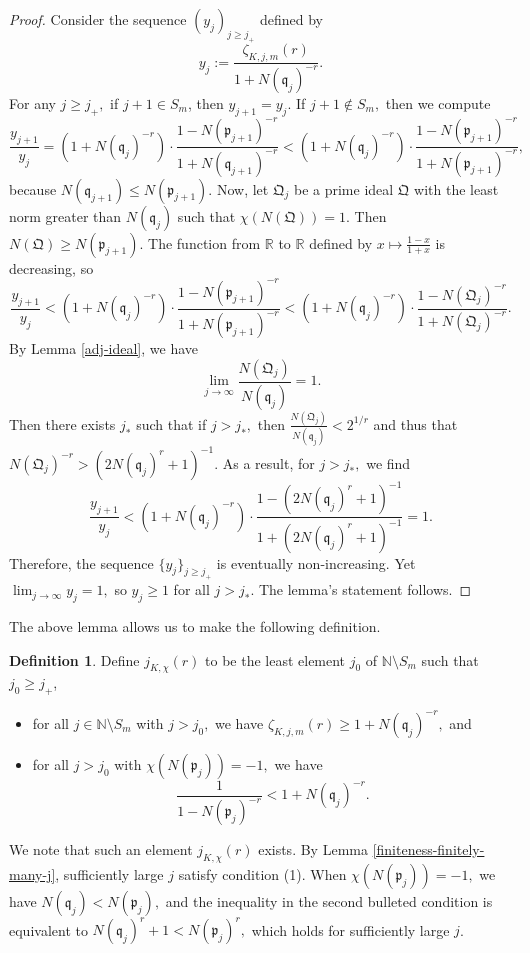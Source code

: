 \documentclass[12pt]{amsart}
\theoremstyle{definition}
\newtheorem{definition}[theorem]{Definition}
\numberwithin{equation}{section}
\newcommand{\p}{\mathfrak{p}}
\newcommand{\QQ}{\mathfrak{Q}}
\newcommand{\q}{\mathfrak{q}}
\newcommand{\N}{\mathbb{N}}
\newcommand{\R}{\mathbb{R}}
\begin{document}
\begin{proof}
    Consider the sequence $(y_j)_{j \geq j_+}$ defined by $$y_j := \frac{\zeta_{K,j,m}(r)}{1 + N(\mathfrak{q}_j)^{-r}}.$$ For any $j \geq j_+,$ if $j + 1 \in S_m$, then $y_{j+1}=y_j.$ If $j + 1 \not\in S_m,$ then we compute 
    $$ \frac{y_{j+1}}{y_j} = (1 + N(\mathfrak{q}_j)^{-r}) \cdot \frac{1 - N(\p_{j+1})^{-r}}{1 + N(\mathfrak{q}_{j+1})^{-r}} < (1 + N(\mathfrak{q}_j)^{-r}) \cdot \frac{1 - N(\p_{j+1})^{-r}}{1 + N(\mathfrak{p}_{j+1})^{-r}},$$ because $N(\q_{j+1}) \leq N(\p_{j+1}).$ Now, let $\mathfrak{Q}_j$ be a prime ideal $\mathfrak{Q}$ with the least norm greater than $N(\q_j)$ such that $\chi(N(\QQ)) = 1.$ Then $N(\QQ) \geq N(\p_{j+1}).$ The function from $\R$ to $\R$ defined by $x \mapsto \frac{1-x}{1+x}$ is decreasing, so 
    $$\frac{y_{j+1}}{y_j} < (1 + N(\q_j)^{-r}) \cdot \frac{1 - N(\p_{j+1})^{-r}}{1 + N(\p_{j+1})^{-r}} < (1 + N(\q_j)^{-r}) \cdot \frac{1- N(\QQ_j)^{-r}}{ 1+ N(\QQ_j)^{-r}}.$$
    By Lemma \ref{adj-ideal}, we have $$\lim_{j\rightarrow \infty} \frac{N(\QQ_j)}{N(\q_j)} = 1.$$ 
    Then there exists $j_*$ such that if $j > j_*,$ then $\frac{N(\QQ_j)}{N(\q_j)} < 2^{1/r}$ and thus that $N(\QQ_j)^{-r} > (2 N(\q_j)^r + 1 )^{-1}.$ As a result, for $j > j_*,$ we find 
    $$\frac{y_{j+1}}{y_j} < (1 + N(\q_j)^{-r}) \cdot \frac{1 - (2 N(\q_j)^r + 1 )^{-1}}{1 + (2 N(\q_j)^r + 1 )^{-1}} = 1.$$  Therefore, the sequence $\{y_j\}_{j \geq j_+}$ is eventually non-increasing. Yet $\lim_{j \rightarrow \infty } y_j = 1,$ so $y_j \geq 1$ for all $j > j_*.$ The lemma's statement follows.
\end{proof}
The above lemma allows us to make the following definition.

\begin{definition} \label{defn-j}
    Define $j_{K,\chi}(r)$ to be the least element $j_0$ of $\N \setminus S_m$ such that $j_0 \geq j_+$, 
    \begin{itemize}
        \item[(1)] for all $j \in \N \setminus S_m$ with $j > j_0,$ we have $\zeta_{K,j,m}(r) \geq 1 + N(\mathfrak q_j)^{-r},$ and  
        \item[(2)] for all $j > j_0$ with $\chi(N(\mathfrak p_j)) = -1,$ we have $$ \frac{1}{1-N(\mathfrak p_j)^{-r}} < 1 + N(\mathfrak q_j)^{-r}.$$
    \end{itemize}
\end{definition}
We note that such an element $j_{K,\chi}(r)$ exists. By Lemma \ref{finiteness-finitely-many-j}, sufficiently large $j$ satisfy condition (1). When $\chi(N(\mathfrak p_j)) = -1,$ we have $N(\mathfrak q_j) < N(\mathfrak p_j),$ and the inequality in the second bulleted condition is equivalent to $N(\mathfrak q_j)^r + 1 < N(\mathfrak p_j)^r,$ which holds for sufficiently large $j$.
\end{document}
